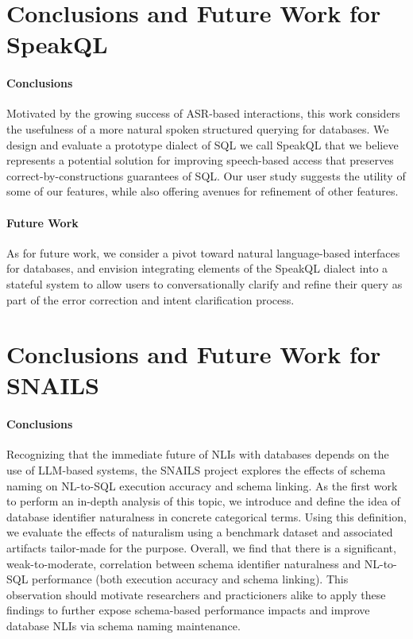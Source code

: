 \section{Conclusions and Future Work for SpeakQL}
\paragraph{\textbf{Conclusions}}
Motivated by the growing success of ASR-based interactions, this work considers the usefulness of a more natural spoken structured querying for databases. 
We design and evaluate a prototype dialect of SQL we call SpeakQL that we believe represents a potential solution for improving speech-based access that preserves correct-by-constructions guarantees of SQL. 
Our user study suggests the utility of some of our features, while also offering avenues for refinement of other features.
\paragraph{\textbf{Future Work}}

As for future work, we consider a pivot toward natural language-based interfaces for databases, and envision integrating elements of the SpeakQL dialect into a stateful system to allow users to conversationally clarify and refine their query as part of the error correction and intent clarification process.

\section{Conclusions and Future Work for SNAILS}
\paragraph{\textbf{Conclusions}}
Recognizing that the immediate future of NLIs with databases depends on the use of LLM-based systems, the SNAILS project explores the effects of schema naming on NL-to-SQL execution accuracy and schema linking.
As the first work to perform an in-depth analysis of this topic, we introduce and define the idea of database identifier naturalness in concrete categorical terms.
Using this definition, we evaluate the effects of naturalism using a benchmark dataset and associated artifacts tailor-made for the purpose.
Overall, we find that there is a significant, weak-to-moderate, correlation between schema identifier naturalness and NL-to-SQL performance (both execution accuracy and schema linking).
This observation should motivate researchers and practicioners alike to apply these findings to further expose schema-based performance impacts and improve database NLIs via schema naming maintenance.
